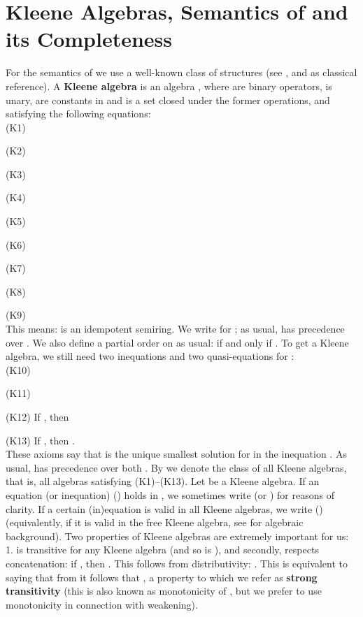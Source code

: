 \documentclass{eptcs}
\begin{document}
\section{Kleene Algebras, Semantics of  and its Completeness}

For the semantics of  we use a well-known class of structures
(see \cite{kozen:kleene}, and \cite{conway:regular} as classical reference).
A \textbf{Kleene algebra} is an algebra , 
where  are binary operators,  is unary,  are
constants in  and
 is a set closed under the former
operations, and satisfying the following equations:
\\

(K1) 

(K2) 

(K3) 

(K4) 

(K5) 

(K6) 

(K7) 

(K8) 

(K9) 
\\

This means:  is an idempotent semiring. We write  for
; as usual,  has precedence over . 
 We also define a partial order
on  as usual:  if and only if .
To get a Kleene algebra, we still need two inequations and two 
quasi-equations for :
\\

(K10) 

(K11) 

(K12) If , then 

(K13) If , then .
\\

These axioms say that  is the unique smallest solution for 
in the inequation . As usual,  has precedence over 
both . By  we denote the class of
all Kleene algebras, that is, all algebras satisfying 
(K1)--(K13). Let  be a Kleene algebra. If an equation
(or inequation)  () holds in , we sometimes
write  (or ) for reasons of clarity.
If a certain (in)equation is valid in all Kleene algebras, we write
 () (equivalently, if it is valid in the free
Kleene algebra, see \cite{burris} for algebraic background).
 Two properties of Kleene algebras are extremely
important for us: 1.  is transitive
for any Kleene algebra  (and so is ), and secondly, 
respects concatenation: if 
, then . This follows from distributivity:
. This is 
equivalent to saying that from  it follows that ,
a property to which we refer as \textbf{strong transitivity}
(this is also known as monotonicity of , but we prefer to use
monotonicity in connection with weakening).
\end{document}

